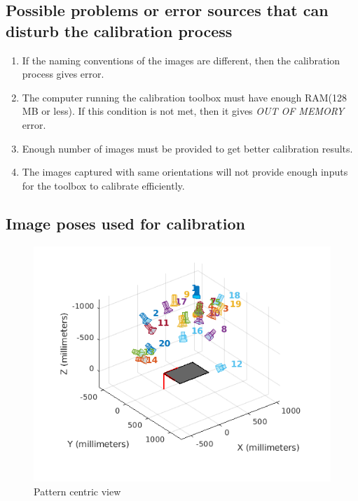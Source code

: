 \documentclass[11pt,a4paper]{article}
\begin{document}
\subsection{Possible problems or error sources that can disturb the calibration process}
\begin{enumerate}
\item If the naming conventions of the images are different, then the calibration process gives error.
\item The computer running the calibration toolbox must have enough RAM(128 MB or less). If this condition is not met, then it gives \textit{OUT OF MEMORY} error.
\item Enough number of images must be provided to get better calibration results.
\item The images captured with same orientations will not provide enough inputs for the toolbox to calibrate efficiently.
\end{enumerate}

\subsection{Image poses used for calibration}
\begin{figure}[H]
\includegraphics[scale=0.7]{pattern_centric_view.png}
\caption{Pattern centric view}
\end{figure}
\end{document}
